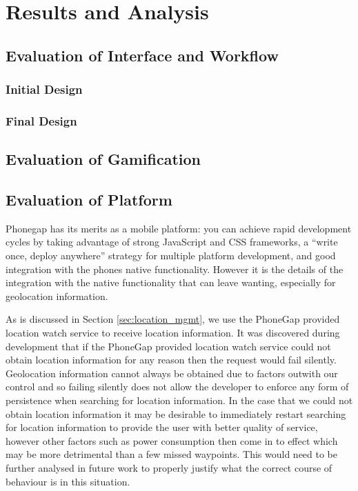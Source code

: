 \chapter{Results and Analysis}\label{ch_results}

\section{Evaluation of Interface and Workflow}
\subsection{Initial Design}

\subsection{Final Design}

\section{Evaluation of Gamification}

\section{Evaluation of Platform}
Phonegap has its merits as a mobile platform: you can achieve rapid
development cycles by taking advantage of strong JavaScript and CSS
frameworks, a ``write once, deploy anywhere'' strategy for multiple
platform development, and good integration with the phones native
functionality. However it is the details of the integration with the
native functionality that can leave wanting, especially for
geolocation information.

As is discussed in Section \ref{sec:location_mgmt}, we use the PhoneGap
provided location watch service to receive location information. It
was discovered during development that if the PhoneGap provided
location watch service could not obtain location information for any
reason then the request would fail silently. Geolocation information
cannot always be obtained due to factors outwith our control and so
failing silently does not allow the developer to enforce any form of
persistence when searching for location information. In the case that
we could not obtain location information it may be desirable to
immediately restart searching for location information to provide the
user with better quality of service, however other factors such as
power consumption then come in to effect which may be more detrimental
than a few missed waypoints. This would need to be further analysed in
future work to properly justify what the correct course of behaviour
is in this situation.

